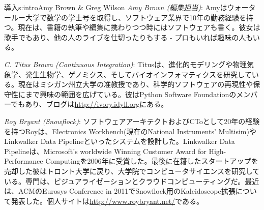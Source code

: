 \begin{aosachapter}{導入}{s:intro}{Amy Brown \& Greg Wilson}
\emph{Amy Brown (編集担当)}: Amyはウォータールー大学で数学の学士号を取得し、ソフトウェア業界で10年の勤務経験を持つ。現在は、書籍の執筆や編集に携わりつつ時にはソフトウェアも書く。彼女は歌手でもあり、他の人のライブを仕切ったりもする - プロもいれば趣味の人もいる。

\emph{C. Titus Brown (Continuous Integration)}: Titusは、進化的モデリングや物理気象学、発生生物学、ゲノミクス、そしてバイオインフォマティクスを研究している。現在はミシガン州立大学の准教授であり、科学的ソフトウェアの再現性や保守性にまで興味の範囲を広げている。彼はPython Software Foundationのメンバーでもあり、ブログは\url{http://ivory.idyll.org}にある。

\emph{Roy Bryant (Snowflock)}: ソフトウェアアーキテクトおよびCToとして20年の経験を持つRoyは、Electronics Workbench(現在のNational Instruments' Multisim)やLinkwalker Data Pipelineといったシステムを設計した。Linkwalker Data Pipelineは、Microsoft's worldwide Winning Customer Award for High-Performance Computingを2006年に受賞した。最後に在籍したスタートアップを売却した彼はトロント大学に戻り、大学院でコンピュータサイエンスを研究している。専門は、ビジュアライゼーションとクラウドコンピューティングだ。最近は、ACMのEurosys Conference in 2011でSnowflock用のKaleidoscope拡張について発表した。個人サイトは\url{http://www.roybryant.net/}である。


\end{aosachapter}
